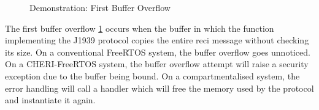 \documentclass[a4paper, 11pt]{article}
\begin{document}
\begin{figure}
        \begin{center}
        \end{center}
        \caption{Demonstration: First Buffer Overflow} 
		\label{fig:demo_overflow}

	\end{figure}

The first buffer overflow \ref{fig:demo_overflow} occurs when the buffer in which the function implementing the J1939 protocol copies the entire reci message without checking its size. On a conventional FreeRTOS system, the buffer overflow goes unnoticed.
On a CHERI-FreeRTOS system, the buffer overflow attempt will raise a security exception due to the buffer being bound. On a compartmentalised system, the error handling will call a handler which will free the memory used by the protocol and instantiate it again.
\end{document}
